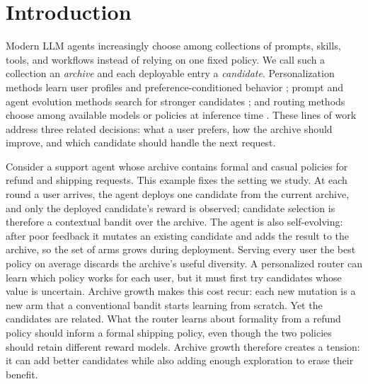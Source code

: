 \documentclass{article} %
\begin{document}
\section{Introduction}

\label{sec:intro}

Modern LLM agents increasingly choose among collections of prompts, skills, tools, and workflows instead of relying on one fixed policy. We call such a collection an \emph{archive} and each deployable entry a \emph{candidate}. Personalization methods learn user profiles and preference-conditioned behavior \citep{salemi2023lamp,zhao2025prefeval,jin2026personalizing}; prompt and agent evolution methods search for stronger candidates \citep{fernando2023promptbreeder,guo2024evoprompt,zhou2024symbolic,agrawal2025geparp}; and routing methods choose among available models or policies at inference time \citep{ong2024routellm,hu2024routerbench,li2025llmbandit,tsai2026neuralucb}. These lines of work address three related decisions: what a user prefers, how the archive should improve, and which candidate should handle the next request.

Consider a support agent whose archive contains formal and casual policies for refund and shipping requests. This example fixes the setting we study. At each round a user arrives, the agent deploys one candidate from the current archive, and only the deployed candidate's reward is observed; candidate selection is therefore a contextual bandit over the archive. The agent is also self-evolving: after poor feedback it mutates an existing candidate and adds the result to the archive, so the set of arms grows during deployment. Serving every user the best policy on average discards the archive's useful diversity. A personalized router can learn which policy works for each user, but it must first try candidates whose value is uncertain. Archive growth makes this cost recur: each new mutation is a new arm that a conventional bandit starts learning from scratch. Yet the candidates are related. What the router learns about formality from a refund policy should inform a formal shipping policy, even though the two policies should retain different reward models. Archive growth therefore creates a tension: it can add better candidates while also adding enough exploration to erase their benefit.
\end{document}
